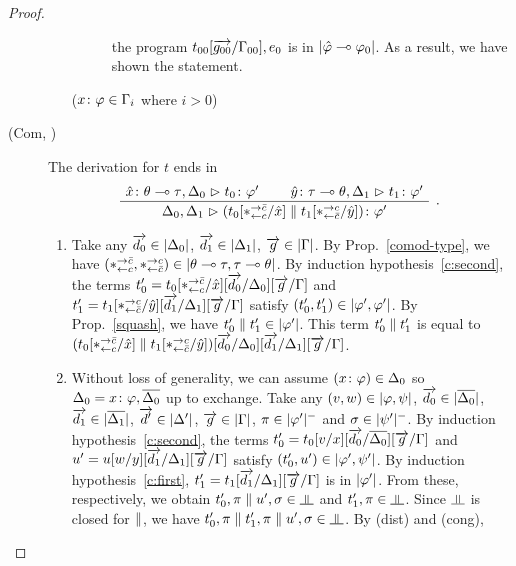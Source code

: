 \begin{proof}
\begin{description}
\begin{enumerate}[label=\textit{(\arabic{*})}]
\begin{description}
		   the program
		   $ t_{00}[\overrightarrow{g_{00}}/\Gamma_{00}], e_0 $ is in
		   $|{\hat{\varphi}\multimap\varphi_0}|$.
		   As a result, we have shown the statement.
	      \item[(${x} \colon{\varphi}\in\Gamma_i$ where $i>0$)]
	     \end{description}
       \end{enumerate}
   \item[(Com, \textminus)]
       The derivation for $t$ ends in
       \[
       \aseq{\tj{\hat x}{\theta\limp\tau},\D_0}{\tj{t_0}{\phi'}}
       \aseq{\tj{\hat y}{\tau\limp\theta},\D_1}{\tj{t_1}{\phi'}}
       \bseq{\D_0,\D_1}{\tj{(t_0[\comodL/\hat x]\conc t_1[\comodR/\hat
       y])}{\phi'}}
       \DisplayProof\enspace.
       \]
       \begin{enumerate}[label=\textit{(\arabic{*})}]
	\item Take any
	      $\overrightarrow{d_0}\in|{\Delta_0}|$,
	      $\overrightarrow{d_1}\in|{\Delta_1}|$,
	      $\overrightarrow{g}  \in|{\Gamma}|$.
	      By Prop.~\ref{comod-type}, we have
	      $(\ast^{\rightarrow {\bar{c}}}_{\leftarrow{c}},\ast^{\rightarrow {c}}_{\leftarrow{\bar{c}}})\in|{\theta\multimap\tau,\tau\multimap\theta}|$.
	      By induction hypothesis~\ref{c:second}, the terms
	      $t_0'=t_0[\ast^{\rightarrow {\bar{c}}}_{\leftarrow{c}}/\hat x][\overrightarrow{d_0}/\Delta_0][\overrightarrow g/\Gamma]$
	      and
	      $t_1'=t_1[\ast^{\rightarrow {c}}_{\leftarrow{\bar{c}}}/\hat y][\overrightarrow{d_1}/\Delta_1][\overrightarrow g/\Gamma]$
	      satisfy
	      $(t_0',t_1')\in|{\varphi',\varphi'}|$.
	      By Prop.~\ref{squash}, we have $t_0'\parallel
	      t_1'\in|{\varphi'}|$.
	      This term $t_0'\parallel t_1'$ is equal to
	      $(t_0[\ast^{\rightarrow {\bar{c}}}_{\leftarrow{c}}/\hat x]\parallel t_1[\ast^{\rightarrow {c}}_{\leftarrow{\bar{c}}}/\hat
	      y])[\overrightarrow{d_0}/\Delta_0][\overrightarrow{d_1}/\Delta_1][\overrightarrow g/\Gamma]$.
	\item Without loss of generality,
	      we can assume $({x} \colon{\varphi})\in\Delta_0$ so
	      $\Delta_0 ={x} \colon{\varphi}, \overline{\Delta_0}$ up to exchange.
	      Take any
	      $(v,w)\in|{\varphi,\psi}|$,
	      $\overrightarrow{d_0}\in|{\overline{\Delta_0}}|$,
	      $\overrightarrow{d_1}\in|{\overline{\Delta_1}}|$,
	      $\overrightarrow{d'}\in|{\Delta'}|$,
	      $\overrightarrow g\in |{\Gamma}|$,
	      $\pi\in|{\varphi'}|^-$ and
	      $\sigma\in|{\psi'}|^-$.
	      By induction hypothesis~\ref{c:second},
	      the terms $t_0'=t_0[v/x][\overrightarrow{d_0}/\overline{\Delta_0}][\overrightarrow
	      g/\Gamma]$
	      and
	      $u'=u[w/y][\overrightarrow{d_1}/\Delta_1][\overrightarrow g/\Gamma]$
	      satisfy
	      $(t_0',u')\in|{\varphi',\psi'}|$.
	      By induction hypothesis~\ref{c:first},
	      $t_1'=t_1[\overrightarrow{d_1}/\Delta_1][\overrightarrow g/\Gamma]$ is in $|{\varphi'}|$.
	      From these, respectively, we obtain
	      $t_0',\pi\conc u',\sigma\in\bbot$
	      and
	      $t_1',\pi\in\bbot$.
	      Since $\bbot$ is closed for $\parallel$,
	      we have $t_0',\pi\conc t_1',\pi\conc u',\sigma\in\bbot$.
	      By (dist) and (cong),

\end{enumerate}
\end{description}
\end{proof}
